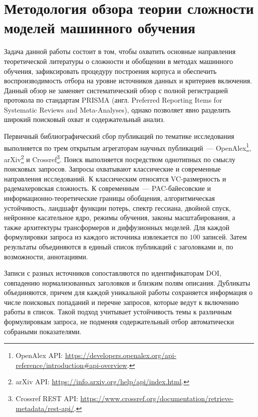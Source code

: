 \section{Методология обзора теории сложности моделей машинного обучения}

Задача данной работы состоит в том, чтобы охватить основные направления теоретической литературы о сложности и обобщении в методах машинного обучения, зафиксировать процедуру построения корпуса и обеспечить воспроизводимость отбора на уровне источников данных и критериев включения.
Данный обзор не заменяет систематический обзор с полной регистрацией протокола по стандартам PRISMA (англ. Preferred Reporting Items for Systematic Reviews and Meta-Analyses), однако позволяет явно разделить широкий поисковый охват и содержательный анализ.

Первичный библиографический сбор публикаций по тематике исследования выполняется по трем открытым агрегаторам научных публикаций~--- OpenAlex\footnote{OpenAlex API: \url{https://developers.openalex.org/api-reference/introduction#api-overview}.}, arXiv\footnote{arXiv API: \url{https://info.arxiv.org/help/api/index.html}.} и Crossref\footnote{Crossref REST API: \url{https://www.crossref.org/documentation/retrieve-metadata/rest-api/}.}. Поиск выполняется посредством однотипных по смыслу поисковых запросов. Запросы охватывают классические и современные направления исследований.
К классическим относятся VC-размерность и радемахеровская сложность.
К современным~--- PAC-байесовские и информационно-теоретические границы обобщения, алгоритмическая устойчивость, ландшафт функции потерь, спектр гессиана, двойной спуск, нейронное касательное ядро, режимы обучения, законы масштабирования, а также архитектуры трансформеров и диффузионных моделей.
Для каждой формулировки запроса из каждого источника извлекается по $100$ записей. Затем результаты объединяются в единый список публикаций с заголовками и, по возможности, аннотациями.

Записи с разных источников сопоставляются по идентификаторам DOI, совпадению нормализованных заголовков и близким полям описания.
Дубликаты объединяются, причем для каждой уникальной работы сохраняется информация о числе поисковых попаданий и перечне запросов, которые ведут к включению работы в список.
Такой подход учитывает устойчивость темы к различным формулировкам запроса, не подменяя содержательный отбор автоматически собраными показателями.


